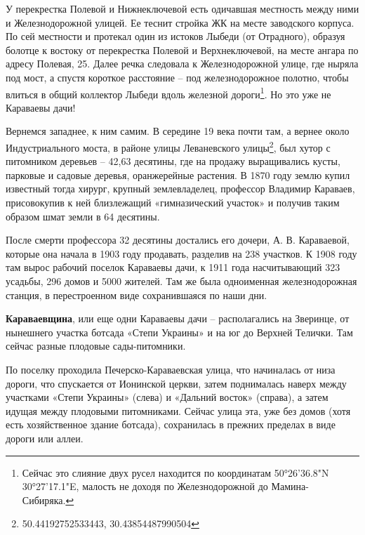 

У перекрестка Полевой и Нижнеключевой есть одичавшая местность между ними и Железнодорожной улицей. Ее теснит стройка ЖК на месте заводского корпуса. По сей местности и протекал один из истоков Лыбеди (от Отрадного), образуя болотце к востоку от перекрестка Полевой и Верхнеключевой, на месте ангара по адресу Полевая, 25. Далее речка следовала к Железнодорожной улице, где ныряла под мост, а спустя короткое расстояние – под железнодорожное полотно, чтобы влиться в общий коллектор Лыбеди вдоль железной дороги\footnote{Сейчас это слияние двух русел находится по координатам 50°26'36.8"N 30°27'17.1"E, малость не доходя по Железнодорожной до Мамина-Сибиряка.}. Но это уже не Караваевы дачи!

Вернемся западнее, к ним самим. В середине 19 века почти там, а вернее около Индустриального моста, в районе улицы Леваневского улицы\footnote{50.44192752533443, 30.43854487990504}, был хутор с питомником деревьев – 42,63 десятины, где на продажу выращивались кусты, парковые и садовые деревья, оранжерейные растения. В 1870 году землю купил известный тогда хирург, крупный землевладелец, профессор Владимир Караваев, присовокупив к ней близлежащий «гимназический участок» и получив таким образом шмат земли в 64 десятины. 

После смерти профессора 32 десятины достались его дочери, А. В. Караваевой, которые она начала в 1903 году продавать, разделив на 238 участков. К 1908 году там вырос рабочий поселок Караваевы дачи, к 1911 года насчитывающий 323 усадьбы, 296 домов и 5000 жителей. Там же была одноименная железнодорожная станция, в перестроенном виде сохранившаяся по наши дни.\\ 

\medskip

\textbf{Караваевщина}, или еще одни Караваевы дачи – располагались на Зверинце, от нынешнего участка ботсада «Степи Украины» и на юг до Верхней Телички. Там сейчас разные плодовые сады-питомники. 

По поселку проходила Печерско-Караваевс\-кая улица, что начиналась от низа дороги, что спускается от Ионинской церкви, затем поднималась наверх между участками «Степи Украины» (слева) и «Дальний восток» (справа), а затем идущая между плодовыми питомниками. Сейчас улица эта, уже без домов (хотя есть хозяйственное здание ботсада), сохранилась в прежних пределах в виде дороги или аллеи.


